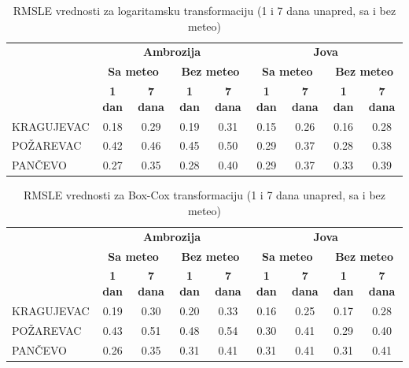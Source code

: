 \documentclass[12pt]{article}
\begin{document}
\begin{table}[h!]
\centering
\caption{RMSLE vrednosti za logaritamsku transformaciju (1 i 7 dana unapred, sa i bez meteo)}
\begin{tabular}{|l|c|c|c|c||c|c|c|c|}
\hline
\label{tab:rmsle_log}
\multirow{3}{*}{\textbf{Grad}} 
& \multicolumn{4}{c||}{\textbf{Ambrozija}} 
& \multicolumn{4}{c|}{\textbf{Jova}} \\ \cline{2-9}
& \multicolumn{2}{c|}{\textbf{Sa meteo}} & \multicolumn{2}{c||}{\textbf{Bez meteo}} 
& \multicolumn{2}{c|}{\textbf{Sa meteo}} & \multicolumn{2}{c|}{\textbf{Bez meteo}} \\ \cline{2-9}
& \textbf{1 dan} & \textbf{7 dana} & \textbf{1 dan} & \textbf{7 dana} 
& \textbf{1 dan} & \textbf{7 dana} & \textbf{1 dan} & \textbf{7 dana} \\ \hline
KRAGUJEVAC     & 0.18 & 0.29 & 0.19 & 0.31 & 0.15 & 0.26 & 0.16 & 0.28 \\ \hline
POŽAREVAC & 0.42 & 0.46 & 0.45 & 0.50 & 0.29 & 0.37 & 0.28 & 0.38 \\ \hline
PANČEVO        & 0.27 & 0.35 & 0.28 & 0.40 & 0.29 & 0.37 & 0.33 & 0.39 \\ \hline
\end{tabular}
\end{table}

\begin{table}[h!]
\centering
\caption{RMSLE vrednosti za Box-Cox transformaciju (1 i 7 dana unapred, sa i bez meteo)}
\begin{tabular}{|l|c|c|c|c||c|c|c|c|}
\hline
\label{tab:rmsle_boxcox}
\multirow{3}{*}{\textbf{Grad}} 
& \multicolumn{4}{c||}{\textbf{Ambrozija}} 
& \multicolumn{4}{c|}{\textbf{Jova}} \\ \cline{2-9}
& \multicolumn{2}{c|}{\textbf{Sa meteo}} & \multicolumn{2}{c||}{\textbf{Bez meteo}} 
& \multicolumn{2}{c|}{\textbf{Sa meteo}} & \multicolumn{2}{c|}{\textbf{Bez meteo}} \\ \cline{2-9}
& \textbf{1 dan} & \textbf{7 dana} & \textbf{1 dan} & \textbf{7 dana} 
& \textbf{1 dan} & \textbf{7 dana} & \textbf{1 dan} & \textbf{7 dana} \\ \hline
KRAGUJEVAC     & 0.19 & 0.30 & 0.20 & 0.33 & 0.16 & 0.25 & 0.17 & 0.28 \\ \hline
POŽAREVAC & 0.43 & 0.51 & 0.48 & 0.54 & 0.30 & 0.41 & 0.29 & 0.40 \\ \hline
PANČEVO        & 0.26 & 0.35 & 0.31 & 0.41 & 0.31 & 0.41 & 0.31 & 0.41 \\ \hline
\end{tabular}
\end{table}
\end{document}

